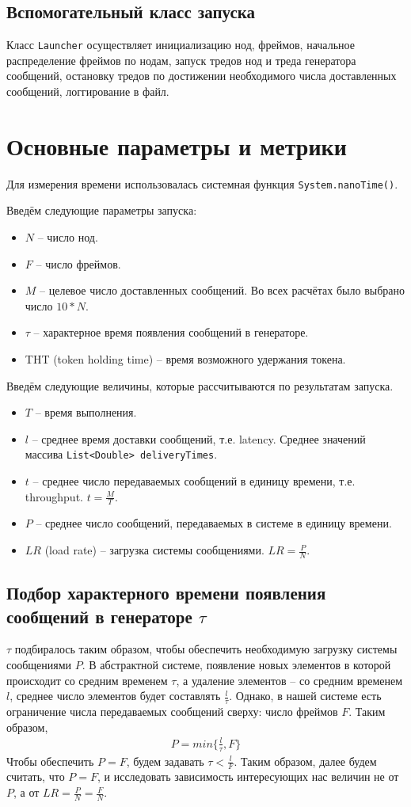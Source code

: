 \documentclass[12pt]{article}
\begin{document}
\subsection{Вспомогательный класс запуска}
Класс \lstinline|Launcher| осуществляет инициализацию нод, фреймов, начальное распределение фреймов по нодам, запуск тредов нод и треда генератора сообщений, остановку тредов по достижении необходимого числа доставленных сообщений, логгирование в файл.

\section{Основные параметры и метрики}
Для измерения времени использовалась системная функция \lstinline|System.nanoTime()|.

Введём следующие параметры запуска:
\begin{itemize}
\item $N$ – число нод.
\item $F$ – число фреймов. 
\item $M$ – целевое число доставленных сообщений. Во всех расчётах было выбрано число $10*N$.
\item $\tau$ – характерное время появления сообщений в генераторе. 
\item THT (token holding time) – время возможного удержания токена.
\end{itemize}

Введём следующие величины, которые рассчитываются по результатам запуска.
\begin{itemize}
\item $T$ – время выполнения.
\item $l$ – среднее время доставки сообщений, т.е. latency. Среднее значений массива \lstinline|List<Double> deliveryTimes|.
\item $t$ – среднее число передаваемых сообщений в единицу времени, т.е. throughput. $t = \frac{M}{T}$.
\item $P$ – среднее число сообщений, передаваемых в системе в единицу времени.
\item $LR$ (load rate) – загрузка системы сообщениями. $LR = \frac{P}{N}$.
\end{itemize}

\subsection{Подбор характерного времени появления сообщений в генераторе $\tau$}
$\tau$ подбиралось таким образом, чтобы обеспечить необходимую загрузку системы сообщениями $P$.
В абстрактной системе, появление новых элементов в которой происходит со средним временем $\tau$, а удаление элементов – со средним временем $l$, среднее число элементов будет составлять $\frac{l}{\tau}$. Однако, в нашей системе есть ограничение числа передаваемых сообщений сверху: число фреймов $F$. Таким образом, 
\begin{gather}
P=min\{\frac{l}{\tau}, F\}
\end{gather}
Чтобы обеспечить $P=F$, будем задавать $\tau < {\frac{l}{F}}$.
Таким образом, далее будем считать, что $P=F$, и исследовать зависимость интересующих нас величин не от $P$, а от $LR= \frac{P}{N}= \frac{F}{N}$.
\end{document}
